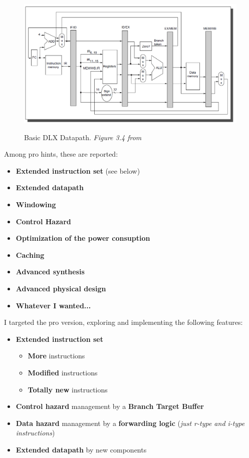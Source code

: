 \begin{figure}[H]
\centering
\includegraphics[scale=.7]{Immagini/00}
\label{00}
\caption{Basic DLX Datapath. \textit{Figure 3.4 from \cite{book:rif.1}}}
\end{figure}

Among pro hints, these are reported:
\begin{itemize}
\item \textbf{Extended instruction set} (see below)
\item \textbf{Extended datapath}
\item \textbf{Windowing}
\item \textbf{Control Hazard}
\item \textbf{Optimization of the power consuption}
\item \textbf{Caching}
\item \textbf{Advanced synthesis}
\item \textbf{Advanced physical design}
\item \textbf{Whatever I wanted...}
\end{itemize}

I targeted the pro version, exploring and implementing the following features:
\begin{itemize}
\item \textbf{Extended instruction set}
\begin{itemize}
\item \textbf{More} instructions
\item \textbf{Modified} instructions
\item \textbf{Totally new} instructions
\end{itemize}
\item \textbf{Control hazard} management by a \textbf{Branch Target Buffer}
\item \textbf{Data hazard} management by a \textbf{forwarding logic} (\textit{just r-type and i-type instructions})
\item \textbf{Extended datapath} by new components
\end{itemize}

